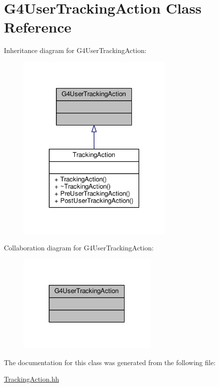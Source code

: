 \hypertarget{classG4UserTrackingAction}{}\section{G4\+User\+Tracking\+Action Class Reference}
\label{classG4UserTrackingAction}


Inheritance diagram for G4\+User\+Tracking\+Action\+:
\nopagebreak
\begin{figure}[H]
\begin{center}
\leavevmode
\includegraphics[width=218pt]{classG4UserTrackingAction__inherit__graph}
\end{center}
\end{figure}


Collaboration diagram for G4\+User\+Tracking\+Action\+:
\nopagebreak
\begin{figure}[H]
\begin{center}
\leavevmode
\includegraphics[width=196pt]{classG4UserTrackingAction__coll__graph}
\end{center}
\end{figure}


The documentation for this class was generated from the following file\+:\begin{DoxyCompactItemize}
\item 
\hyperlink{TrackingAction_8hh}{Tracking\+Action.\+hh}\end{DoxyCompactItemize}
